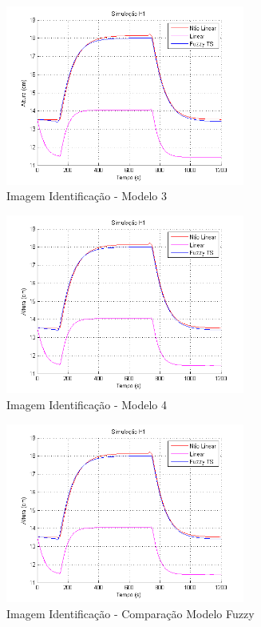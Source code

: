\begin{figure}[H]
	\centering
	\includegraphics[width=0.7\textwidth]{img/FM_h1_5_10_15.png}
	\caption{Imagem Identificação - Modelo 3}
	\label{figH1TS2}
\end{figure}

\begin{figure}[H]
	\centering
	\includegraphics[width=0.7\textwidth]{img/FM_h1_5_10_15.png}
	\caption{Imagem Identificação - Modelo 4}
	\label{figH1TS2}
\end{figure}

\begin{figure}[H]
	\centering
	\includegraphics[width=0.7\textwidth]{img/FM_h1_5_10_15.png}
	\caption{Imagem Identificação - Comparação Modelo Fuzzy}
	\label{figH1TS2}
\end{figure}

